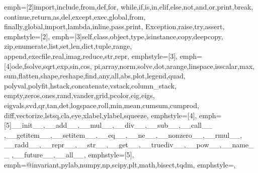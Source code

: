 {                                            %
emph={[2]import,include,from,def,for,
while,if,is,in,elif,else,not,and,or,print,break,
continue,return,as,del,except,exec,global,from,
finally,global,import,lambda,inline,pass,print,
Exception,raise,try,assert}, %
emphstyle={[2]\color{Color_Keywords_2}\bfseries},      %
emph={[3]self,class,object,type,isinstance,copy,deepcopy,
zip,enumerate,list,set,len,dict,tuple,range,
append,execfile,real,imag,reduce,str,repr}, %
emphstyle={[3]\color{Color_Keywords_3}\bfseries},      %
emph={[4]ode,fsolve,sqrt,exp,sin,cos,
pi,array,norm,solve,dot,arange,linspace,isscalar,max,
sum,flatten,shape,reshape,find,any,all,abs,plot,legend,quad,
polyval,polyfit,hstack,concatenate,vstack,column_stack,
empty,zeros,ones,rand,vander,grid,pcolor,eig,eigs,
eigvals,svd,qr,tan,det,logspace,roll,min,mean,cumsum,cumprod,
diff,vectorize,lstsq,cla,eye,xlabel,ylabel,squeeze}, %
emphstyle={[4]\color{Color_Keywords_4}},      %
emph={[5]__init__,__add__,__mul__,__div__,__sub__,__call__
,__getitem__,__setitem__,__eq__,__ne__,__nonzero__,__rmul__,
__radd__,__repr__,__str__,__get__,__truediv__,__pow__,__name__
,__future__,__all__}, %
emphstyle={[5]\color{Color_Keywords_5}\bfseries},      %
emph={@invariant,pylab,numpy,np,scipy,plt,math,bisect,tqdm},
emphstyle={\color{Color_Decorators}\slshape},
}





